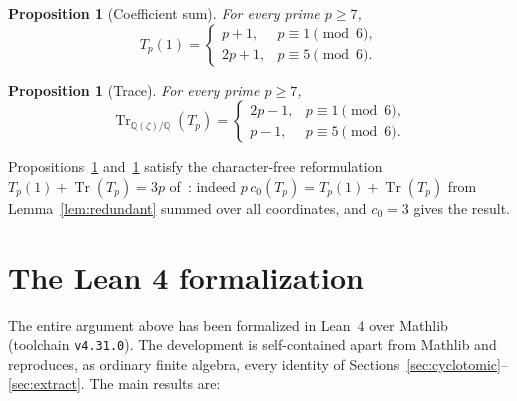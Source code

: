 \documentclass[11pt]{article}
\newtheorem{proposition}[theorem]{Proposition}
\theoremstyle{definition}
\DeclareMathOperator{\Tr}{Tr}
\newcommand{\Q}{\mathbb{Q}}
\begin{document}
\begin{proposition}[Coefficient sum]\label{prop:coeffsum}
For every prime $p\ge7$,
\[
  T_p(1)=
  \begin{cases}
    p+1, & p\equiv1\pmod6,\\
    2p+1, & p\equiv5\pmod6.
  \end{cases}
\]
\end{proposition}

\begin{proposition}[Trace]\label{prop:trace}
For every prime $p\ge 7$,
\[
  \Tr_{\Q(\zeta)/\Q}(T_p)=
  \begin{cases}
    2p-1, & p\equiv 1 \pmod 6,\\
    p-1, & p\equiv 5 \pmod 6.
  \end{cases}
\]
\end{proposition}

Propositions~\ref{prop:coeffsum} and~\ref{prop:trace} satisfy the
character-free reformulation $T_p(1)+\Tr(T_p)=3p$ of~\cite{Burke2026}:
indeed $p\,c_0(T_p)=T_p(1)+\Tr(T_p)$ from Lemma~\ref{lem:redundant}
summed over all coordinates, and $c_0=3$ gives the result.

\section{The Lean 4 formalization}\label{sec:lean}

The entire argument above has been formalized in Lean~4 over Mathlib (toolchain \texttt{v4.31.0}). The development is self-contained apart from Mathlib and reproduces, as ordinary finite algebra, every identity of Sections~\ref{sec:cyclotomic}--\ref{sec:extract}. The main results are:
\end{document}
